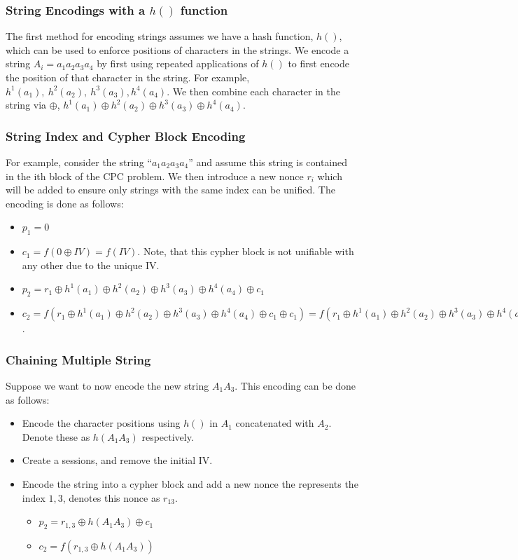 \documentclass{easychair}
\begin{document}
{\subsubsection{String Encodings with a $h()$ function}
The first method for encoding strings assumes we have a
hash function, $h()$, which can be used to enforce 
positions of characters in the strings. 
We encode a string $A_i = a_1 a_2 a_3 a_4$ by 
first using repeated applications of $h()$ to first encode
the position of that character in the string. For example,
$h^1(a_1), ~h^2(a_2), ~h^3(a_3), h^4(a_4)$.
We then combine each character in the string via $\oplus$,
$h^1(a_1) \oplus h^2(a_2) \oplus h^3(a_3) \oplus h^4(a_4)$. 


\subsubsection{String Index and Cypher Block Encoding}

For example, consider the string ``$a_1a_2a_3a_4$'' and assume
this string is contained in the ith block of the CPC problem.
We then introduce a new nonce $r_i$ which will be added to ensure
only strings with the same index can be unified. 
The encoding is done as follows:
\begin{itemize}
	\item $p_1 = 0$
	\item $c_1 = f(0 \oplus IV) = f(IV)$. 
	Note, that this cypher block is 
	not unifiable with any other due to the unique IV.
	\item $p_2 = r_1 \oplus h^1(a_1) \oplus h^2(a_2) \oplus h^3(a_3) \oplus h^4(a_4) \oplus c_1$
	\item $c_2 = f(r_1 \oplus h^1(a_1) \oplus h^2(a_2) \oplus h^3(a_3) \oplus h^4(a_4) \oplus c_1 \oplus c_1) = 
	f(r_1 \oplus h^1(a_1) \oplus h^2(a_2) \oplus h^3(a_3) \oplus h^4(a_4))$. 
\end{itemize} 


\subsubsection{Chaining Multiple String}
Suppose we want to now encode the new string $A_1 A_3$.
This encoding can be done as follows:
\begin{itemize}
	\item Encode the character positions using $h()$ in
	$A_1$ concatenated with $A_2$. 
	Denote these as $h(A_1A_3)$
	respectively. 
	\item Create a sessions, and remove the initial IV.
	\item Encode the string into a cypher block and add 
	a new nonce the represents the index $1,3$, denotes this
	nonce as $r_{13}$.
	\begin{itemize}
		\item $p_2= r_{1,3} \oplus h(A_1 A_3) \oplus c_1$
		\item $c_2 = f(r_{1,3} \oplus h(A_1 A_3))$
	\end{itemize} 
\end{itemize}

}
\end{document}
